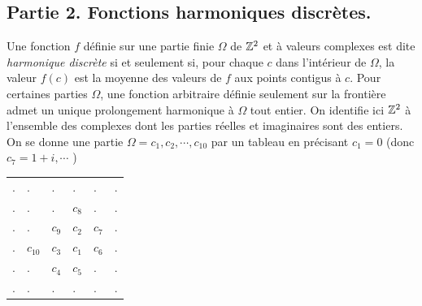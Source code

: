 \subsection*{Partie 2. Fonctions harmoniques discrètes.}
Une fonction $f$ définie sur une partie finie $\Omega$ de $\mathbb{Z}^2$ et à valeurs complexes est dite \emph{harmonique discrète} si et seulement si, pour chaque $c$ dans l'intérieur de $\Omega$, la valeur $f(c)$ est la moyenne des valeurs de $f$ aux points contigus à $c$.\newline
Pour certaines parties $\Omega$, une fonction arbitraire définie seulement sur la frontière admet un unique prolongement harmonique à $\Omega$ tout entier.\newline
On identifie ici $\mathbb{Z}^2$ à l'ensemble des complexes dont les parties réelles et imaginaires sont des entiers. On se donne une partie $\Omega={c_1,c_2,\cdots, c_{10}}$ par un tableau en précisant $c_1=0$ (donc $c_7 = 1+i, \cdots$ )
\begin{center}
\begin{tabular}{llllll}
$.$&$.$ & $.$ & $.$ & $.$ & $.$\\
$.$&$.$ & $.$ & $c_8$ & $.$ & $.$\\
$.$&$.$ & $c_9$ & $c_2$ & $c_7$ & $.$\\
$.$&$c_{10}$ & $c_3$ & $c_1$ & $c_6$ & $.$\\
$.$&$.$ & $c_4$ & $c_5$ & $.$ & $.$\\
$.$&$.$ & $.$ & $.$ & $.$ & $.$
\end{tabular}
\end{center}
